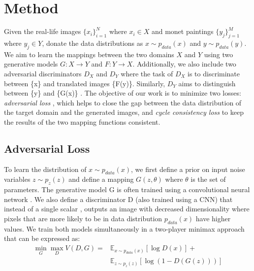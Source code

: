 \documentclass[10pt,twocolumn,letterpaper]{article}
\begin{document}
\section{Method}
Given the real-life images $\{x_i\}_{i=1}^N$ where $x_{i}\in X$ and monet paintings $\{y_j\}_{j=1}^M$ where $y_{j}\in Y$, donate the data distributions as $x \sim p_{data}(x)$ and $y \sim p_{data}(y)$. We aim to learn the mappings between the two domains $X$ and $Y$ using two generative models $G : X \longrightarrow Y$ and $F : Y \longrightarrow X$. Additionally, we also include two adversarial discriminators $D_{X}$ and $D_{Y}$ where the task of $D_{X}$ is to discriminate between \{x\} and translated images \{F(y)\}. Similarly, $D_{Y}$ aims to distinguish between \{y\} and \{G(x)\} \cite{cyclegan}. The objective of our work is to minimize two losses: \emph{adversarial loss} \cite{simplegan}, which helps to close the gap between the data distribution of the target domain and the generated images, and \emph{cycle consistency loss} to keep the results of the two mapping functions consistent.

\subsection{Adversarial Loss}
To learn the distribution of $x \sim p_{data}(x)$, we first define a prior on input noise variables $z \sim p_{z}(z)$ and define a mapping $G(z,\theta)$ where $\theta$ is the set of parameters. The generative model G is often trained using a convolutional neural network \cite{cnn}. We also define a discriminator D (also trained using a CNN) that instead of a single scalar \cite{simplegan}, outputs an image with decreased dimensionality where pixels that are more likely to be in data distribution $p_{data}(x)$ have higher values. We train both models simultaneously in a two-player minimax approach that can be expressed as:
\begin{equation}
	\begin{split}
		\min_G \max_D V(D,G) = &\mathbb{E}_{x \sim p_{data}(x)}[\log{D(x)}]+ \\
		&\mathbb{E}_{z \sim p_{z}(z)}[\log{(1-D(G(z)))}]
	\end{split}
\end{equation}
\end{document}
